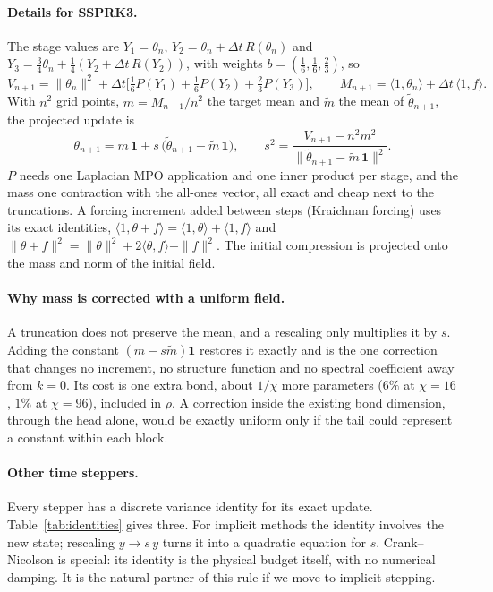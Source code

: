 \documentclass[aps,prfluids,reprint,onecolumn,amsmath,amssymb,nofootinbib,floatfix]{revtex4-2}
\begin{document}
\paragraph{Details for SSPRK3.} The stage values are $Y_1=\theta_n$,
$Y_2=\theta_n+\Delta t\,R(\theta_n)$ and
$Y_3=\tfrac34\theta_n+\tfrac14(Y_2+\Delta t\,R(Y_2))$, with weights
$b=(\tfrac16,\tfrac16,\tfrac23)$, so
\begin{equation}
V_{n+1} = \|\theta_n\|^2 + \Delta t\Big[\tfrac16 P(Y_1)+\tfrac16 P(Y_2)+\tfrac23 P(Y_3)\Big],
\qquad
M_{n+1} = \langle1,\theta_n\rangle + \Delta t\,\langle1,f\rangle .
\label{eq:rescale}
\end{equation}
With $n^2$ grid points, $m=M_{n+1}/n^2$ the target mean and $\tilde m$ the mean of
$\tilde\theta_{n+1}$, the projected update is
\begin{equation}
\theta_{n+1} = m\,\mathbf{1} + s\,\big(\tilde\theta_{n+1}-\tilde m\,\mathbf{1}\big),
\qquad
s^2=\frac{V_{n+1}-n^2m^2}{\|\tilde\theta_{n+1}-\tilde m\,\mathbf{1}\|^2}.
\label{eq:project}
\end{equation}
$P$ needs one Laplacian MPO application and one inner product per stage, and the
mass one contraction with the all-ones vector, all exact and cheap next to the
truncations. A forcing increment added between steps (Kraichnan forcing) uses its
exact identities, $\langle1,\theta+f\rangle=\langle1,\theta\rangle+\langle1,f\rangle$
and $\|\theta+f\|^2=\|\theta\|^2+2\langle\theta,f\rangle+\|f\|^2$. The initial
compression is projected onto the mass and norm of the initial field.

\paragraph{Why mass is corrected with a uniform field.} A truncation does not
preserve the mean, and a rescaling only multiplies it by $s$. Adding the constant
$(m-s\tilde m)\mathbf{1}$ restores it exactly and is the one correction that
changes no increment, no structure function and no spectral coefficient away
from $k=0$. Its cost is one extra bond, about $1/\chi$ more parameters ($6\%$ at
$\chi=16$, $1\%$ at $\chi=96$), included in $\rho$. A correction inside the
existing bond dimension, through the head alone, would be exactly uniform only if
the tail could represent a constant within each block.

\paragraph{Other time steppers.} Every stepper has a discrete variance identity
for its exact update. Table~\ref{tab:identities} gives three. For implicit methods
the identity involves the new state; rescaling $y\to s\,y$ turns it into a
quadratic equation for $s$. Crank--Nicolson is special: its identity is the
physical budget itself, with no numerical damping. It is the natural partner of
this rule if we move to implicit stepping.
\end{document}
